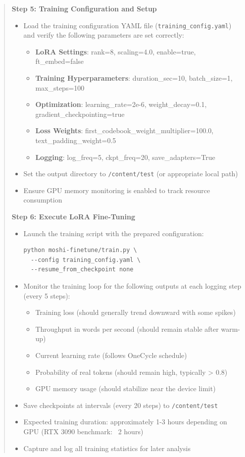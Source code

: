 \documentclass[12pt,a4paper]{article}
\begin{document}
\begin{quote}
{\textbf{Step 5: Training Configuration and Setup}
\begin{itemize}
    \item Load the training configuration YAML file (\texttt{training\_config.yaml}) and verify the following parameters are set correctly:
    \begin{itemize}
        \item \textbf{LoRA Settings}: rank=8, scaling=4.0, enable=true, ft\_embed=false
        \item \textbf{Training Hyperparameters}: duration\_sec=10, batch\_size=1, max\_steps=100
        \item \textbf{Optimization}: learning\_rate=2e-6, weight\_decay=0.1, gradient\_checkpointing=true
        \item \textbf{Loss Weights}: first\_codebook\_weight\_multiplier=100.0, text\_padding\_weight=0.5
        \item \textbf{Logging}: log\_freq=5, ckpt\_freq=20, save\_adapters=True
    \end{itemize}
    \item Set the output directory to \texttt{/content/test} (or appropriate local path)
    \item Ensure GPU memory monitoring is enabled to track resource consumption
\end{itemize}

\textbf{Step 6: Execute LoRA Fine-Tuning}
\begin{itemize}
    \item Launch the training script with the prepared configuration:
    \begin{verbatim}
python moshi-finetune/train.py \
  --config training_config.yaml \
  --resume_from_checkpoint none
    \end{verbatim}
    \item Monitor the training loop for the following outputs at each logging step (every 5 steps):
    \begin{itemize}
        \item Training loss (should generally trend downward with some spikes)
        \item Throughput in words per second (should remain stable after warm-up)
        \item Current learning rate (follows OneCycle schedule)
        \item Probability of real tokens (should remain high, typically > 0.8)
        \item GPU memory usage (should stabilize near the device limit)
    \end{itemize}
    \item Save checkpoints at intervals (every 20 steps) to \texttt{/content/test}
    \item Expected training duration: approximately 1-3 hours depending on GPU (RTX 3090 benchmark: ~2 hours)
    \item Capture and log all training statistics for later analysis
\end{itemize}

}
\end{quote}
\end{document}
